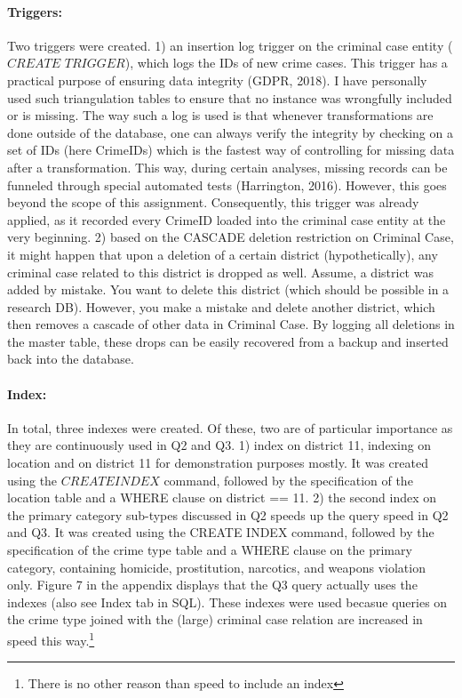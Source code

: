 \documentclass[a4paper]{article}
\begin{document}
\paragraph{Triggers:} Two triggers were created. 1) an insertion log trigger on the criminal case entity ($CREATE$ $TRIGGER$), which logs the IDs of new crime cases. This trigger has a practical purpose of ensuring data integrity (GDPR, 2018). I have personally used such triangulation tables to ensure that no instance was wrongfully included or is missing. The way such a log is used is that whenever transformations are done outside of the database, one can always verify the integrity by checking on a set of IDs (here CrimeIDs) which is the fastest way of controlling for missing data after a transformation. This way, during certain analyses, missing records can be funneled through special automated tests (Harrington, 2016). However, this goes beyond the scope of this assignment. Consequently, this trigger was already applied, as it recorded every CrimeID loaded into the criminal case entity at the very beginning.
2) based on the CASCADE deletion restriction on Criminal Case, it might happen that upon a deletion of a certain district (hypothetically), any criminal case related to this district is dropped as well. Assume, a district was added by mistake. You want to delete this district (which should be possible in a research DB). However, you make a mistake and delete another district, which then removes a cascade of other data in Criminal Case. By logging all deletions in the master table, these drops can be easily recovered from a backup and inserted back into the database.
\paragraph{Index:} In total, three indexes were created. Of these, two are of particular importance as they are continuously used in Q2 and Q3. 1) index on district 11, indexing on location and on district 11 for demonstration purposes mostly. It was created using the $CREATE INDEX$ command, followed by the specification of the location table and a WHERE clause on district == 11. 2) the second index on the primary category sub-types discussed in Q2 speeds up the query speed in Q2 and Q3. It was created using the CREATE INDEX command, followed by the specification of the crime type table and a WHERE clause on the primary category, containing homicide, prostitution, narcotics, and weapons violation only. Figure 7 in the appendix displays that the Q3 query actually uses the indexes (also see Index tab in SQL). These indexes were used becasue queries on the crime type joined with the (large) criminal case relation are increased in speed this way.\footnote{There is no other reason than speed to include an index} 
\end{document}

